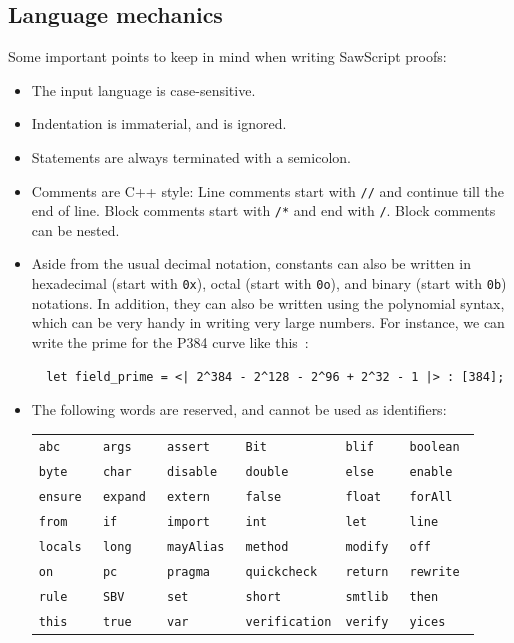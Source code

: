 \documentclass[12pt]{galois-whitepaper}
\newcommand{\sawScript}{{\sc SawScript}\xspace}
\begin{document}
\subsection{Language mechanics}
Some important points to keep in mind when writing \sawScript proofs:
\begin{itemize}
\item The input language is case-sensitive.
\item Indentation is immaterial, and is ignored.
\item Statements are always terminated with a semicolon.
\item Comments are C++ style: Line comments start with {\tt //} and continue till the end of line. Block
comments start with {\tt /*} and end with {\tt */}. Block comments can be nested.
\item Aside from the usual decimal notation, constants can also be written in hexadecimal (start with {\tt 0x}), octal (start with {\tt 0o}),
and binary (start with {\tt 0b}) notations. In addition,
they can also be written using the polynomial syntax, which can be very handy in writing very large numbers.
For instance, we can write the prime for the P384 curve like this~\cite[Section 2.8.1]{sec2}:
\begin{Verbatim}
  let field_prime = <| 2^384 - 2^128 - 2^96 + 2^32 - 1 |> : [384];
\end{Verbatim}
\item The following words are reserved, and cannot be used as identifiers:

\begin{tabular}{llllll}
{\tt abc         } & {\tt args        } & {\tt assert      } & {\tt Bit         } & {\tt blif        } & {\tt boolean     }\\
{\tt byte        } & {\tt char        } & {\tt disable     } & {\tt double      } & {\tt else        } & {\tt enable      }\\
{\tt ensure      } & {\tt expand      } & {\tt extern      } & {\tt false       } & {\tt float       } & {\tt forAll      }\\
{\tt from        } & {\tt if          } & {\tt import      } & {\tt int         } & {\tt let         } & {\tt line        }\\
{\tt locals      } & {\tt long        } & {\tt mayAlias    } & {\tt method      } & {\tt modify      } & {\tt off         }\\
{\tt on          } & {\tt pc          } & {\tt pragma      } & {\tt quickcheck  } & {\tt return      } & {\tt rewrite     }\\
{\tt rule        } & {\tt SBV         } & {\tt set         } & {\tt short       } & {\tt smtlib      } & {\tt then        }\\
{\tt this        } & {\tt true        } & {\tt var         } & {\tt verification} & {\tt verify      } & {\tt yices       }\\
\end{tabular}


\end{itemize}
\end{document}
